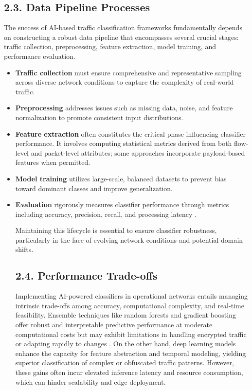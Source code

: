 \documentclass[11pt]{article}
\begin{document}
\subsection{2.3. Data Pipeline Processes}

The success of AI-based traffic classification frameworks fundamentally depends on constructing a robust data pipeline that encompasses several crucial stages: traffic collection, preprocessing, feature extraction, model training, and performance evaluation.

\begin{itemize}
\item \textbf{Traffic collection} must ensure comprehensive and representative sampling across diverse network conditions to capture the complexity of real-world traffic.

\item \textbf{Preprocessing} addresses issues such as missing data, noise, and feature normalization to promote consistent input distributions.

\item \textbf{Feature extraction} often constitutes the critical phase influencing classifier performance. It involves computing statistical metrics derived from both flow-level and packet-level attributes; some approaches incorporate payload-based features when permitted.

\item \textbf{Model training} utilizes large-scale, balanced datasets to prevent bias toward dominant classes and improve generalization.

\item \textbf{Evaluation} rigorously measures classifier performance through metrics including accuracy, precision, recall, and processing latency \cite{ref51}.

Maintaining this lifecycle is essential to ensure classifier robustness, particularly in the face of evolving network conditions and potential domain shifts.

\subsection{2.4. Performance Trade-offs}

Implementing AI-powered classifiers in operational networks entails managing intrinsic trade-offs among accuracy, computational complexity, and real-time feasibility. Ensemble techniques like random forests and gradient boosting offer robust and interpretable predictive performance at moderate computational costs but may exhibit limitations in handling encrypted traffic or adapting rapidly to changes \cite{ref51}. On the other hand, deep learning models enhance the capacity for feature abstraction and temporal modeling, yielding superior classification of complex or obfuscated traffic patterns. However, these gains often incur elevated inference latency and resource consumption, which can hinder scalability and edge deployment.


\end{itemize}
\end{document}
